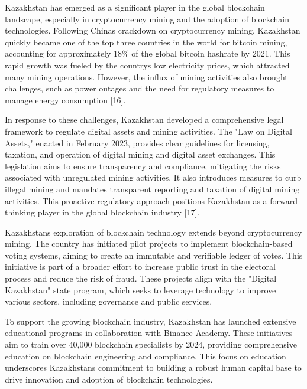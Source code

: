 Kazakhstan has emerged as a significant player in the global blockchain
landscape, especially in cryptocurrency mining and the adoption of
blockchain technologies. Following China\textquotesingle s crackdown on
cryptocurrency mining, Kazakhstan quickly became one of the top three
countries in the world for bitcoin mining, accounting for approximately
18\% of the global bitcoin hashrate by 2021. This rapid growth was
fueled by the country\textquotesingle s low electricity prices, which
attracted many mining operations. However, the influx of mining
activities also brought challenges, such as power outages and the need
for regulatory measures to manage energy consumption {[}16{]}.

In response to these challenges, Kazakhstan developed a comprehensive
legal framework to regulate digital assets and mining activities. The
"Law on Digital Assets," enacted in February 2023, provides clear
guidelines for licensing, taxation, and operation of digital mining and
digital asset exchanges. This legislation aims to ensure transparency
and compliance, mitigating the risks associated with unregulated mining
activities. It also introduces measures to curb illegal mining and
mandates transparent reporting and taxation of digital mining
activities. This proactive regulatory approach positions Kazakhstan as a
forward-thinking player in the global blockchain industry\hspace{0pt}
{[}17{]}.

Kazakhstan\textquotesingle s exploration of blockchain technology
extends beyond cryptocurrency mining. The country has initiated pilot
projects to implement blockchain-based voting systems, aiming to create
an immutable and verifiable ledger of votes. This initiative is part of
a broader effort to increase public trust in the electoral process and
reduce the risk of fraud. These projects align with the "Digital
Kazakhstan" state program, which seeks to leverage technology to improve
various sectors, including governance and public services.

To support the growing blockchain industry, Kazakhstan has launched
extensive educational programs in collaboration with Binance Academy.
These initiatives aim to train over 40,000 blockchain specialists by
2024, providing comprehensive education on blockchain engineering and
compliance. This focus on education underscores
Kazakhstan\textquotesingle s commitment to building a robust human
capital base to drive innovation and adoption of blockchain
technologies.

